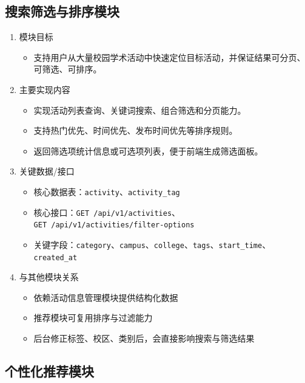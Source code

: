 \documentclass[UTF8,a4paper,12pt,fontset=none]{ctexrep}
\providecommand{\tightlist}{}
\begin{document}
\subsection{搜索筛选与排序模块}\label{ux641cux7d22ux7b5bux9009ux4e0eux6392ux5e8fux6a21ux5757}

\begin{enumerate}
\def\labelenumi{\arabic{enumi}.}
\item
  模块目标

  \begin{itemize}
  \tightlist
  \item
    支持用户从大量校园学术活动中快速定位目标活动，并保证结果可分页、可筛选、可排序。
  \end{itemize}
\item
  主要实现内容

  \begin{itemize}
  \tightlist
  \item
    实现活动列表查询、关键词搜索、组合筛选和分页能力。
  \item
    支持热门优先、时间优先、发布时间优先等排序规则。
  \item
    返回筛选项统计信息或可选项列表，便于前端生成筛选面板。
  \end{itemize}
\item
  关键数据/接口

  \begin{itemize}
  \tightlist
  \item
    核心数据表：\texttt{activity}、\texttt{activity\_tag}
  \item
    核心接口：\texttt{GET\ /api/v1/activities}、\\
    \texttt{GET\ /api/v1/activities/filter-options}
  \item
    关键字段：\texttt{category}、\texttt{campus}、\texttt{college}、\texttt{tags}、\texttt{start\_time}、\texttt{created\_at}
  \end{itemize}
\item
  与其他模块关系

  \begin{itemize}
  \tightlist
  \item
    依赖活动信息管理模块提供结构化数据
  \item
    推荐模块可复用排序与过滤能力
  \item
    后台修正标签、校区、类别后，会直接影响搜索与筛选结果
  \end{itemize}
\end{enumerate}

\subsection{个性化推荐模块}\label{ux4e2aux6027ux5316ux63a8ux8350ux6a21ux5757}
\end{document}
